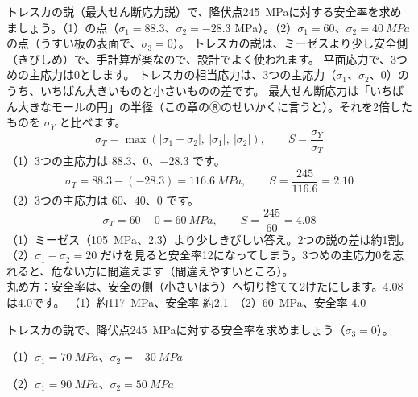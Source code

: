 \begin{phreidai}[トレスカの説で確かめる]
\label{ph:力-9:ex6}トレスカの説（最大せん断応力説）で、降伏点\qty{245}{MPa}に対する安全率を求めましょう。（1）の点（$\sigma_1=88.3$、$\sigma_2=-28.3$ MPa）。（2）$\sigma_1=60$、$\sigma_2=\qty{40}{MPa}$ の点（うすい板の表面で、$\sigma_3=0$）。
\phbamen
トレスカの説は、ミーゼスより少し安全側（きびしめ）で、手計算が楽なので、設計でよく使われます。
\phmushi
平面応力で、3つめの主応力は0とします。
\phzu
トレスカの相当応力は、3つの主応力（$\sigma_1$、$\sigma_2$、0）のうち、いちばん大きいものと小さいものの差です。
\phriyu
最大せん断応力は「いちばん大きなモールの円」の半径（この章の⑧のせいかくに言うと）。それを2倍したものを $\sigma_Y$ と比べます。
\phtateru
\[\sigma_T=\max(|\sigma_1-\sigma_2|,\ |\sigma_1|,\ |\sigma_2|),\qquad S=\frac{\sigma_Y}{\sigma_T}\]
\phtoku
（1）3つの主応力は $88.3$、$0$、$-28.3$ です。
\[\sigma_T=88.3-(-28.3)=\qty{116.6}{MPa},\qquad S=\frac{245}{116.6}=2.10\]
（2）3つの主応力は $60$、$40$、$0$ です。
\[\sigma_T=60-0=\qty{60}{MPa},\qquad S=\frac{245}{60}=4.08\]
\phtashikame
（1）ミーゼス（\qty{105}{MPa}、2.3）より少しきびしい答え。2つの説の差は約1割。\\
（2）$\sigma_1-\sigma_2=20$ だけを見ると安全率12になってしまう。3つめの主応力0を忘れると、危ない方に間違えます（間違えやすいところ）。\\
丸め方：安全率は、安全の側（小さいほう）へ切り捨てて2けたにします。4.08 は4.0です。
\kotae （1）約\qty{117}{MPa}、安全率 約2.1　（2）\qty{60}{MPa}、安全率 4.0
\end{phreidai}
\begin{jibun}
トレスカの説で、降伏点\qty{245}{MPa}に対する安全率を求めましょう（$\sigma_3=0$）。\par（1）$\sigma_1=\qty{70}{MPa}$、$\sigma_2=\qty{-30}{MPa}$\par（2）$\sigma_1=\qty{90}{MPa}$、$\sigma_2=\qty{50}{MPa}$
\end{jibun}

